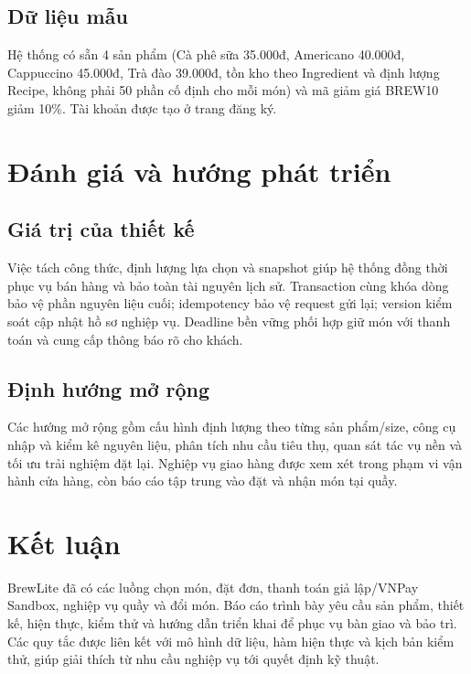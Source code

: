 \documentclass[a4paper]{article}
\begin{document}
\subsection{Dữ liệu mẫu}
Hệ thống có sẵn 4 sản phẩm (Cà phê sữa 35.000đ, Americano 40.000đ, Cappuccino 45.000đ, Trà đào 39.000đ, tồn kho theo Ingredient và định lượng Recipe, không phải 50 phần cố định cho mỗi món) và mã giảm giá BREW10 giảm 10\%. Tài khoản được tạo ở trang đăng ký.

\section{Đánh giá và hướng phát triển}
\subsection{Giá trị của thiết kế}
Việc tách công thức, định lượng lựa chọn và snapshot giúp hệ thống đồng thời phục vụ bán hàng và bảo toàn tài nguyên lịch sử. Transaction cùng khóa dòng bảo vệ phần nguyên liệu cuối; idempotency bảo vệ request gửi lại; version kiểm soát cập nhật hồ sơ nghiệp vụ. Deadline bền vững phối hợp giữ món với thanh toán và cung cấp thông báo rõ cho khách.
\subsection{Định hướng mở rộng}
Các hướng mở rộng gồm cấu hình định lượng theo từng sản phẩm/size, công cụ nhập và kiểm kê nguyên liệu, phân tích nhu cầu tiêu thụ, quan sát tác vụ nền và tối ưu trải nghiệm đặt lại. Nghiệp vụ giao hàng được xem xét trong phạm vi vận hành cửa hàng, còn báo cáo tập trung vào đặt và nhận món tại quầy.

\section{Kết luận}
BrewLite đã có các luồng chọn món, đặt đơn, thanh toán giả lập/VNPay Sandbox, nghiệp vụ quầy và đổi món. Báo cáo trình bày yêu cầu sản phẩm, thiết kế, hiện thực, kiểm thử và hướng dẫn triển khai để phục vụ bàn giao và bảo trì. Các quy tắc được liên kết với mô hình dữ liệu, hàm hiện thực và kịch bản kiểm thử, giúp giải thích từ nhu cầu nghiệp vụ tới quyết định kỹ thuật.
\end{document}
